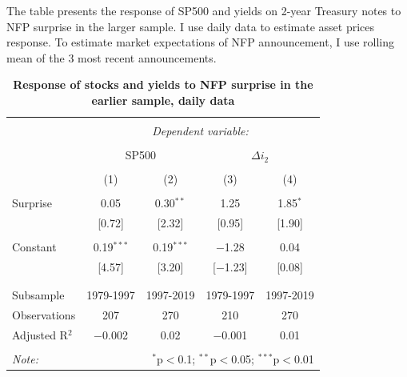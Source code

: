 \documentclass[12pt]{article}
\begin{document}
\begin{table}[!htbp] \centering 
  \caption{\textbf{Response of stocks and yields to NFP surprise in the earlier sample, daily data}} 
  \label{}
      \begin{flushleft}
    {\medskip\small
  The table presents the response of SP500 and yields on 2-year Treasury notes to NFP surprise in the larger sample. I use daily data to estimate asset prices response. To estimate market expectations of NFP announcement, I use rolling mean of the 3 most recent announcements.}
    \medskip
    \end{flushleft}
\begin{tabular}{@{\extracolsep{5pt}}lcccc} 
\\[-1.8ex]\hline 
\hline \\[-1.8ex] 
 & \multicolumn{4}{c}{\textit{Dependent variable:}} \\ 
\cline{2-5} 
\\[-1.8ex] & \multicolumn{2}{c}{SP500} & \multicolumn{2}{c}{$\Delta i_2$} \\ 
\\[-1.8ex] & (1) & (2) & (3) & (4)\\ 
\hline \\[-1.8ex] 
 Surprise & 0.05 & 0.30$^{**}$ & 1.25 & 1.85$^{*}$ \\ 
  & [0.72] & [2.32] & [0.95] & [1.90] \\ 
  & & & & \\ 
 Constant & 0.19$^{***}$ & 0.19$^{***}$ & $-$1.28 & 0.04 \\ 
  & [4.57] & [3.20] & [$-$1.23] & [0.08] \\ 
  & & & & \\ 
\hline \\[-1.8ex] 
Subsample & 1979-1997 & 1997-2019 & 1979-1997 & 1997-2019 \\ 
Observations & 207 & 270 & 210 & 270 \\ 
Adjusted R$^{2}$ & $-$0.002 & 0.02 & $-$0.001 & 0.01 \\ 
\hline 
\hline \\[-1.8ex] 
\textit{Note:}  & \multicolumn{4}{r}{$^{*}$p$<$0.1; $^{**}$p$<$0.05; $^{***}$p$<$0.01} \\ 
\end{tabular} 
\end{table}
\end{document}
